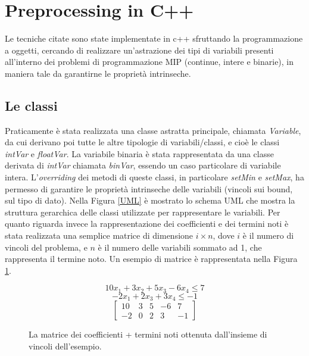 \documentclass{article}
\begin{document}
\section{Preprocessing in C++}

Le tecniche citate sono state implementate in c++ sfruttando la programmazione a oggetti, cercando di realizzare un'astrazione dei tipi di variabili presenti all'interno dei problemi di programmazione MIP (continue, intere e binarie), in maniera tale da garantirne le proprietà intrinseche. 
\newline
\newline
\subsection{Le classi}
Praticamente è stata realizzata una classe astratta principale, chiamata \emph{Variable}, da cui derivano poi tutte le altre tipologie di variabili/classi, e cioè le classi \textit{intVar} e \textit{floatVar}. La variabile binaria è stata rappresentata da una classe derivata di \textit{intVar} chiamata \textit{binVar}, essendo un caso particolare di variabile intera.
\newline
\newline
L'\textit{overriding} dei metodi di queste classi, in particolare \textit{setMin} e \textit{setMax}, ha permesso di garantire le proprietà intrinseche delle variabili (vincoli sui bound, sul tipo di dato).
\newline
\newline
Nella Figura \ref{UML} è mostrato lo schema UML che mostra la struttura gerarchica delle classi utilizzate per rappresentare le variabili.
\newline
\newline
Per quanto riguarda invece la rappresentazione dei coefficienti e dei termini noti è stata realizzata una semplice matrice di dimensione $i \times n$, dove $i$ è il numero di vincoli del problema, e $n$ è il numero delle variabili sommato ad 1, che rappresenta il termine noto. Un esempio di matrice è rappresentata nella Figura \ref{matrix}.
\begin{figure}[ht]
\centering
\[
10x_1 + 3x_2 + 5x_3 - 6x_4 \le 7
\]
\[
-2x_1 + 2x_3 +3x_4 \le -1
\]
\[
\left[\begin{matrix}10 & 3 & 5 & -6 & 7 \\ -2 & 0 & 2 & 3 & -1\end{matrix}\right]
\]
\caption{\footnotesize{La matrice dei coefficienti + termini noti ottenuta dall'insieme di vincoli dell'esempio.}}
\label{matrix}
\end{figure}
\end{document}
